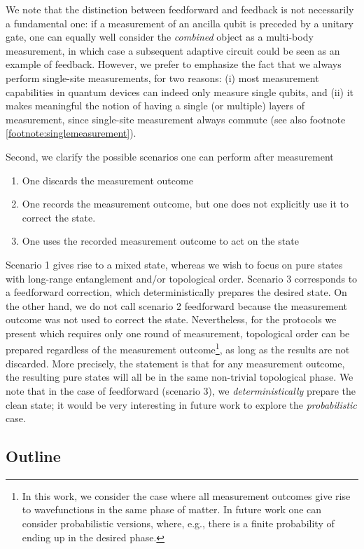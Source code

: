 \documentclass[nofootinbib,prx,twocolumn,showpacs,superscriptaddress,notitlepage,amsmath,amssymb]{revtex4-2}
\theoremstyle{definition}
\begin{document}
We note that the distinction between feedforward and feedback is not necessarily a fundamental one: if a measurement of an ancilla qubit is preceded by a unitary gate, one can equally well consider the \emph{combined} object as a multi-body measurement, in which case a subsequent adaptive circuit could be seen as an example of feedback. However, we prefer to emphasize the fact that we always perform single-site measurements, for two reasons: (i) most measurement capabilities in quantum devices can indeed only measure single qubits, and (ii) it makes meaningful the notion of having a single (or multiple) layers of measurement, since single-site measurement always commute (see also footnote \ref{footnote:singlemeasurement}).

Second, we clarify the possible scenarios one can perform after measurement
\begin{enumerate}
\item One discards the measurement outcome
\item One records the measurement outcome, but one does not explicitly use it to correct the state.
\item One uses the recorded measurement outcome to act on the state
\end{enumerate}

Scenario 1 gives rise to a mixed state, whereas we wish to focus on pure states with long-range entanglement and/or topological order. Scenario 3 corresponds to a feedforward correction, which deterministically prepares the desired state. On the other hand, we do not call scenario 2 feedforward because the measurement outcome was not used to correct the state. Nevertheless, for the protocols we present which requires only one round of measurement, topological order can be prepared regardless of the measurement outcome\footnote{In this work, we consider the case where all measurement outcomes give rise to wavefunctions in the same phase of matter. In future work one can consider probabilistic versions, where, e.g., there is a finite probability of ending up in the desired phase.}, as long as the results are not discarded. More precisely, the statement is that for any measurement outcome, the resulting pure states will all be in the same non-trivial topological phase. We note that in the case of feedforward (scenario 3), we \emph{deterministically} prepare the clean state; it would be very interesting in future work to explore the \emph{probabilistic} case.

\subsection{Outline}
\end{document}

